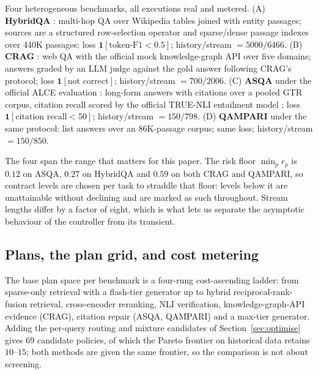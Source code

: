 Four heterogeneous benchmarks, all executions real and metered.
(A) \textbf{HybridQA} \citep{chen2020hybridqa}: multi-hop QA over
Wikipedia tables joined with entity passages; sources are a structured
row-selection operator and sparse/dense passage indexes over 440K
passages; loss $\mathbf{1}[\text{token-F1} < 0.5]$; history/stream
$= 5000/6466$.
(B) \textbf{CRAG} \citep{yang2024cragbench}: web QA with the official
mock knowledge-graph API over five domains; answers graded by an LLM
judge against the gold answer following CRAG's protocol; loss
$\mathbf{1}[\text{not correct}]$; history/stream $= 700/2006$.
(C) \textbf{ASQA} \citep{stelmakh2022asqa} under the official ALCE
evaluation \citep{gao2023alce}: long-form answers with citations over a
pooled GTR corpus, citation recall scored by the official TRUE-NLI
entailment model \citep{honovich2022true}; loss
$\mathbf{1}[\text{citation recall} < 50]$; history/stream $= 150/798$.
(D) \textbf{QAMPARI} \citep{amouyal2022qampari} under the same protocol:
list answers over an 86K-passage corpus; same loss; history/stream
$= 150/850$.

The four span the range that matters for this paper. The risk floor
$\min_p r_p$ is $0.12$ on ASQA, $0.27$ on HybridQA and $0.59$ on both
CRAG and QAMPARI, so contract levels are chosen per task to straddle
that floor: levels below it are unattainable without declining and are
marked as such throughout. Stream lengths differ by a factor of eight,
which is what lets us separate the asymptotic behaviour of the
controller from its transient.

\subsection{Plans, the plan grid, and cost metering}
\label{sec:ladders}

The base plan space per benchmark is a four-rung cost-ascending ladder:
from sparse-only retrieval with a flash-tier generator up to hybrid
reciprocal-rank-fusion retrieval, cross-encoder reranking, NLI
verification, knowledge-graph-API evidence (CRAG), citation repair
(ASQA, QAMPARI) and a max-tier generator. Adding the per-query routing
and mixture candidates of Section~\ref{sec:optimise} gives $69$
candidate policies, of which the Pareto frontier on historical data
retains $10$--$15$; both methods are given the same frontier, so the
comparison is not about screening.

